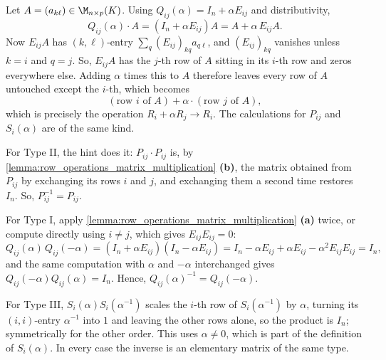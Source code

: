 \begin{exercisesolution}
\label{sol:row_operations_matrix_multiplication_a}
Let $A = (a_{k\ell}) \in \M_{n \times p}(K)$. Using $Q_{ij}(\alpha) = I_n + \alpha E_{ij}$ and distributivity,
\[
Q_{ij}(\alpha) \cdot A = (I_n + \alpha E_{ij}) A = A + \alpha \, E_{ij} A.
\]
Now $E_{ij} A$ has $(k, \ell)$-entry $\sum_{q} (E_{ij})_{kq} a_{q\ell}$, and $(E_{ij})_{kq}$ vanishes unless $k = i$ and $q = j$. So, $E_{ij}A$ has the $j$-th row of $A$ sitting in its $i$-th row and zeros everywhere else. Adding $\alpha$ times this to $A$ therefore leaves every row of $A$ untouched except the $i$-th, which becomes
\[
(\text{row } i \text{ of } A) + \alpha \cdot (\text{row } j \text{ of } A),
\]
which is precisely the operation $R_i + \alpha R_j \longrightarrow R_i$. The calculations for $P_{ij}$ and $S_i(\alpha)$ are of the same kind.
\end{exercisesolution}

\begin{exercisesolution}
\label{sol:elementary_matrix_inverses}
For Type II, the hint does it: $P_{ij} \cdot P_{ij}$ is, by \cref{lemma:row_operations_matrix_multiplication} \textbf{(b)}, the matrix obtained from $P_{ij}$ by exchanging its rows $i$ and $j$, and exchanging them a second time restores $I_n$. So, $P_{ij}^{-1} = P_{ij}$.

For Type I, apply \cref{lemma:row_operations_matrix_multiplication} \textbf{(a)} twice, or compute directly using $i \neq j$, which gives $E_{ij} E_{ij} = 0$:
\[
Q_{ij}(\alpha) \, Q_{ij}(-\alpha) = (I_n + \alpha E_{ij})(I_n - \alpha E_{ij}) = I_n - \alpha E_{ij} + \alpha E_{ij} - \alpha^2 E_{ij}E_{ij} = I_n,
\]
and the same computation with $\alpha$ and $-\alpha$ interchanged gives $Q_{ij}(-\alpha) Q_{ij}(\alpha) = I_n$. Hence, $Q_{ij}(\alpha)^{-1} = Q_{ij}(-\alpha)$.

For Type III, $S_i(\alpha) S_i(\alpha^{-1})$ scales the $i$-th row of $S_i(\alpha^{-1})$ by $\alpha$, turning its $(i,i)$-entry $\alpha^{-1}$ into $1$ and leaving the other rows alone, so the product is $I_n$; symmetrically for the other order. This uses $\alpha \neq 0$, which is part of the definition of $S_i(\alpha)$. In every case the inverse is an elementary matrix of the same type.
\end{exercisesolution}

